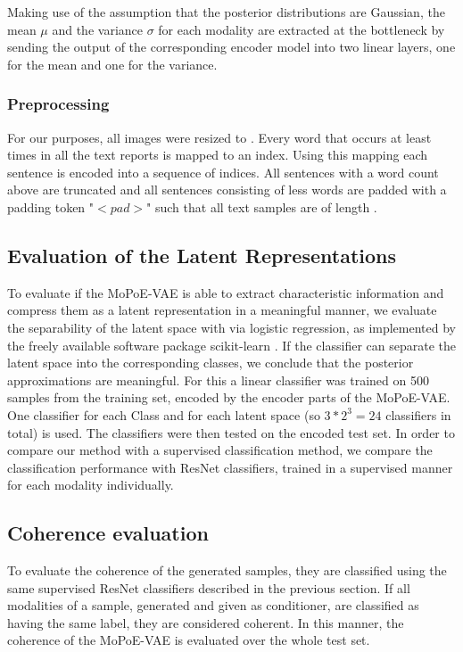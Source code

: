 Making use of the assumption that the posterior distributions are Gaussian, the mean $\mu$ and the variance $\sigma$ for each modality are extracted at the bottleneck by sending the output of the corresponding encoder model into two linear layers, one for the mean and one for the variance.

\subsubsection{Preprocessing}
For our purposes, all images were resized to .
Every word that occurs at least  times in all the text reports is mapped to an index.
Using this mapping each sentence is encoded into a sequence of indices.
All sentences with a word count above  are truncated and all sentences consisting of less words are padded with a padding token "$<pad>$" such that all text samples are of length .

\subsection{Evaluation of the Latent Representations}
To evaluate if the MoPoE-VAE is able to extract characteristic information and compress them as a latent representation in a meaningful manner, we evaluate the separability of the latent space with via logistic regression, as implemented by the freely available software package scikit-learn \cite{scikit}.
If the classifier can separate the latent space into the corresponding classes, we conclude that the posterior approximations are meaningful.
For this a linear classifier was trained on 500 samples from the training set, encoded by the encoder parts of the MoPoE-VAE.
One classifier for each Class and for each latent space (so $3*2^3 = 24$ classifiers in total) is used.
The classifiers were then tested on the encoded test set.
In order to compare our method with a supervised classification method, we compare the classification performance with ResNet \cite{he2016deep} classifiers, trained in a supervised manner for each modality individually.

\subsection{Coherence evaluation}
To evaluate the coherence of the generated samples, they are classified using the same supervised ResNet classifiers described in the previous section.
If all modalities of a sample, generated and given as conditioner, are classified as having the same label, they are considered coherent.
In this manner, the coherence of the MoPoE-VAE is evaluated over the whole test set.

